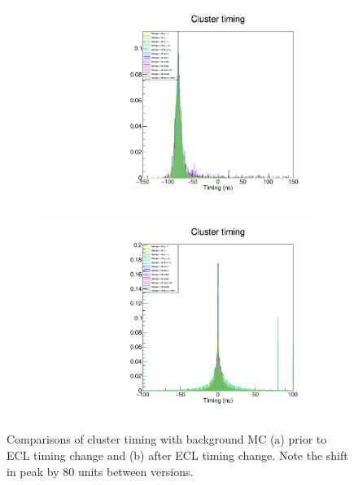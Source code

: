 \documentclass[12pt]{thesis}  %
\begin{document}
   \begin{figure}[h]
        \centering
        \begin{subfigure}[b]{0.475\textwidth}
            \centering
            \includegraphics[width=\textwidth]{images/cluster-timing-old.pdf}
            \caption[]%
            {{\small}}    
            \label{fig:cluster timing old}
        \end{subfigure}
        \begin{subfigure}[b]{0.475\textwidth}  
            \centering 
            \includegraphics[width=\textwidth]{images/cluster-timing-new.pdf}
            \caption[]%
            {{\small}}    
            \label{fig:cluster timing new}
        \end{subfigure}
        \caption{Comparisons of cluster timing with background MC (a) prior to ECL timing change and (b) after ECL timing change. Note the shift in peak by 80 units between versions.}
        \label{fig:cluster timing comparison}
    \end{figure}
\end{document}
